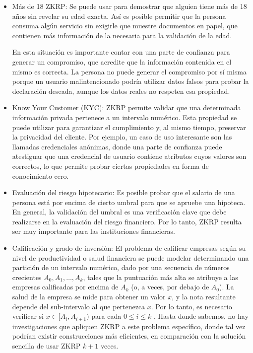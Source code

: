 \begin{itemize}
    \item Más de 18 ZKRP: Se puede usar para demostrar que alguien tiene más de 18 años sin revelar su edad exacta. Así es posible permitir que la persona consuma algún servicio sin exigirle que muestre documentos en papel, que contienen más información de la necesaria para la validación de la edad.

    En esta situación es importante contar con una parte de confianza para generar un compromiso, que acredite que la información contenida en el mismo es correcta. La persona no puede generar el compromiso por sí misma porque un usuario malintencionado podría utilizar datos falsos para probar la declaración deseada, aunque los datos reales no respeten esa propiedad.
    
    \item Know Your Customer (KYC): ZKRP permite validar que una determinada información privada pertenece a un intervalo numérico. Esta propiedad se puede utilizar para garantizar el cumplimiento y, al mismo tiempo, preservar la privacidad del cliente. Por ejemplo, un caso de uso interesante son las llamadas credenciales anónimas, donde una parte de confianza puede atestiguar que una credencial de usuario contiene atributos cuyos valores son correctos, lo que permite probar ciertas propiedades en forma de conocimiento cero.
    
    \item Evaluación del riesgo hipotecario: Es posible probar que el salario de una persona está por encima de cierto umbral para que se apruebe una hipoteca. En general, la validación del umbral es una verificación clave que debe realizarse en la evaluación del riesgo financiero. Por lo tanto, ZKRP resulta ser muy importante para las instituciones financieras.
    
    \item Calificación y grado de inversión: El problema de calificar empresas según su nivel de productividad o salud financiera se puede modelar determinando una partición de un intervalo numérico, dado por una secuencia de números crecientes $A_{0}, A_{1}, \dots, A_{k}$, tales que la puntuación más alta se atribuye a las empresas calificadas por encima de $A_{k}$ (o, a veces, por debajo de $A_{0}$). La salud de la empresa se mide para obtener un valor $x$, y la nota resultante depende del sub-intervalo al que pertenezca $x$. Por lo tanto, es necesario verificar si $x \in [A_{i}, A_{i+1})$ para cada $0 \leq i \leq k$ . Hasta donde sabemos, no hay investigaciones que apliquen ZKRP a este problema específico, donde tal vez podrían existir construcciones más eficientes, en comparación con la solución sencilla de usar ZKRP $k + 1$ veces.
    

\end{itemize}
